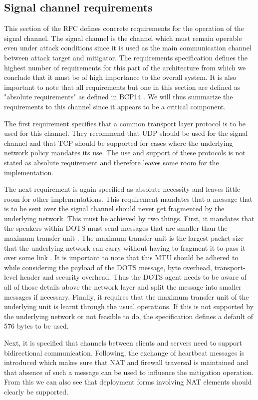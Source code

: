 \subsection{Signal channel requirements}
This section of the RFC defines concrete requirements for the operation of the signal channel. The signal channel is the channel which must remain operable even under attack conditions since it is used as the main communication channel between attack target and mitigator. The requirements specification defines the highest number of requirements for this part of the architecture from which we conclude that it must be of high importance to the overall system. It is also important to note that all requirements but one in this section are defined as "absolute requirements" as defined in BCP14 \cite{bcp14}. We will thus summarize the requirements to this channel since it appears to be a critical component.

The first requirement specifies that a common transport layer protocol is to be used for this channel. They recommend that UDP should be used for the signal channel and that TCP should be supported for cases where the underlying network policy mandates its use. The use and support of these protocols is not stated as absolute requirement and therefore leaves some room for the implementation.

The next requirement is again specified as absolute necessity and leaves little room for other implementations. This requirement mandates that a message that is to be sent over the signal channel should never get fragmented by the underlying network. This must be achieved by two things. First, it mandates that the speakers within DOTS must send messages that are smaller than the maximum transfer unit \cite{rfc8612}. The maximum transfer unit is the largest packet size that the underlying network can carry without having to fragment it to pass it over some link \cite{rfc791}. It is important to note that this MTU should be adhered to while considering the payload of the DOTS message, byte overhead, transport-level header and security overhead. Thus the DOTS agent needs to be aware of all of those details above the network layer and split the message into smaller messages if necessary.
Finally, it requires that the maximum transfer unit of the underlying unit is learnt through the usual operations. If this is not supported by the underlying network or not feasible to do, the specification defines a default of 576 bytes to be used.

Next, it is specified that channels between clients and servers need to support bidirectional communication. Following, the exchange of heartbeat messages is introduced which makes sure that NAT and firewall traversal is maintained and that absence of such a message can be used to influence the mitigation  operation. From this we can also see that deployment forms involving NAT elements should clearly be supported.

